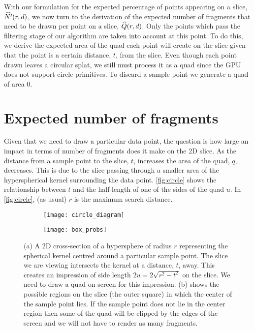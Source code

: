 

With our formulation for the expected percentage of points appearing on a
slice, $\widehat{N'}(r, d)$, we now turn to the derivation of the expected
number of fragments that need to be drawn per point on a slice, 
$\widehat{Q}(r,d)$. Only the points which pass the filtering stage of our algorithm
are taken into account at this point. 
To do this,
we derive the expected area of 
the quad each point will create on the slice given that the point is a certain
distance, $t$, from the slice. Even though each point drawn
leaves a circular splat, we still must process it as a quad since the GPU
does not support circle primitives. To discard a sample point we generate a
quad of area $0$.

\section{Expected number of fragments}

Given that we need to draw a particular data point, the question is how large
an impact in terms of number of fragments does it make on the 2D slice. As the
distance from a sample point to the slice, $t$, increases the area of the 
quad, $q$, decreases. This is due to the slice passing through a smaller area 
of the
hyperspherical kernel surrounding the data point. \autoref{fig:circle} shows the
relationship between $t$ and the half-length of one of the sides of the 
quad $u$.  In \autoref{fig:circle}, (as usual) $r$ is the maximum search distance.

\begin{figure}[htb]
\centering
\begin{subfigure}{0.4\textwidth}
  \texttt{[image: circle\_diagram]}
  \caption{
  }
  \label{fig:circle}
\end{subfigure}%
\begin{subfigure}{0.4\textwidth}
  \texttt{[image: box\_probs]}
  \caption{
  }
  \label{fig:quad_size}
\end{subfigure}
\caption[Kernel/slice interaction]{
  (a) A 2D cross-section of a hypersphere of radius $r$ representing 
  the spherical kernel 
  centred around a particular sample point.  The slice we are
  viewing intersects the kernel at a distance, $t$, away.  This 
  creates an impression of side length $2u = 2\sqrt{r^2-t^2}$ on the 
  slice.  We need to draw a quad on screen for this impression.
  (b) shows the possible regions on the slice (the outer square)
  in which the center of the sample point lies.  If the sample point
  does not lie in the center region then some of the quad will be clipped
  by the edges of the screen and we will not have to render as many 
  fragments.
}
\label{fig:appendix_geom}
\end{figure}


